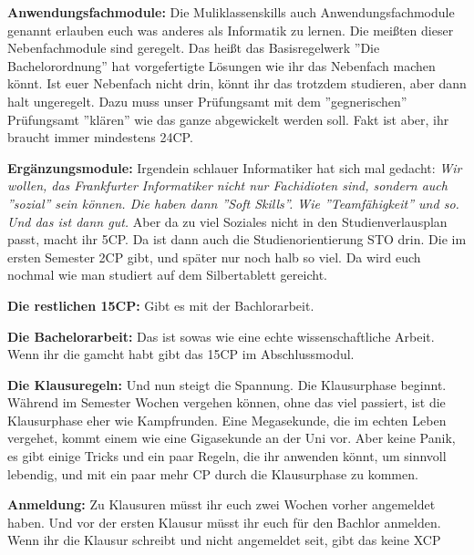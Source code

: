 \textbf{Anwendungsfachmodule:}
Die Muliklassenskills auch Anwendungsfachmodule genannt erlauben euch was anderes als Informatik zu lernen.
Die mei{\ss}ten dieser Nebenfachmodule sind geregelt. Das hei{\ss}t das
Basisregelwerk ''Die Bachelorordnung'' hat vorgefertigte L\"osungen wie ihr das
Nebenfach machen k\"onnt. Ist euer Nebenfach nicht drin, k\"onnt ihr das trotzdem studieren, aber dann halt ungeregelt.
Dazu muss unser Pr\"ufungsamt mit dem ''gegnerischen'' Pr\"ufungsamt ''kl\"aren'' wie das ganze abgewickelt werden soll.
Fakt ist aber, ihr braucht immer mindestens 24CP.

\textbf{Erg\"anzungsmodule:}
Irgendein schlauer Informatiker hat sich mal gedacht: \emph{Wir wollen, das
Frankfurter Informatiker nicht nur Fachidioten sind, sondern auch ''sozial''
sein k\"onnen. Die haben dann ''Soft Skills''. Wie ''Teamf\"ahigkeit'' und so. Und das
ist dann gut.} Aber da zu viel Soziales nicht in den Studienverlausplan passt, macht ihr 5CP.
Da ist dann auch die Studienorientierung STO drin. Die im ersten Semester 2CP gibt, und sp\"ater nur noch halb so viel.
Da wird euch nochmal wie man studiert auf dem Silbertablett gereicht.

\textbf{Die restlichen 15CP:}
Gibt es mit der Bachlorarbeit.

\textbf{Die Bachelorarbeit:}
Das ist sowas wie eine echte wissenschaftliche Arbeit. Wenn ihr die gamcht habt gibt das 15CP im Abschlussmodul.

\textbf{Die Klausuregeln:}
Und nun steigt die Spannung. Die Klausurphase beginnt.
W\"ahrend im Semester Wochen vergehen k\"onnen, ohne das viel passiert, ist die Klausurphase eher wie Kampfrunden.
Eine Megasekunde, die im echten Leben vergehet, kommt einem wie eine Gigasekunde an der Uni vor.
    Aber keine Panik, es gibt einige Tricks und ein paar Regeln, die ihr
anwenden k\"onnt, um sinnvoll lebendig, und mit ein paar mehr CP durch die
Klausurphase zu kommen.

\textbf{Anmeldung:}
Zu Klausuren m\"usst ihr euch zwei Wochen vorher angemeldet haben. Und vor der ersten Klausur m\"usst ihr euch f\"ur den Bachlor anmelden.
Wenn ihr die Klausur schreibt und nicht angemeldet seit, gibt das keine XCP

